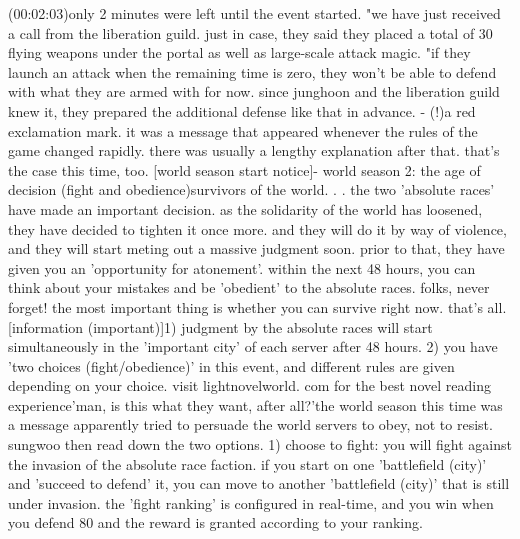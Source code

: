  (00:02:03)only 2 minutes were left until the event started.
"we have just received a call from the liberation guild.
 just in case, they said they placed a total of 30 flying weapons under the portal as well as large-scale attack magic.
"if they launch an attack when the remaining time is zero, they won't be able to defend with what they are armed with for now.
 since junghoon and the liberation guild knew it, they prepared the additional defense like that in advance.
- (!)a red exclamation mark.
it was a message that appeared whenever the rules of the game changed rapidly.
there was usually a lengthy explanation after that.
 that's the case this time, too.
[world season start notice]- world season 2: the age of decision (fight and obedience)survivors of the world.
.
.
 the two 'absolute races' have made an important decision.
as the solidarity of the world has loosened, they have decided to tighten it once more.
 and they will do it by way of violence, and they will start meting out a massive judgment soon.
prior to that, they have given you an 'opportunity for atonement'.
 within the next 48 hours, you can think about your mistakes and be 'obedient' to the absolute races.
folks, never forget! the most important thing is whether you can survive right now.
 that's all.
[information (important)]1) judgment by the absolute races will start simultaneously in the 'important city' of each server after 48 hours.
2) you have 'two choices (fight/obedience)' in this event, and different rules are given depending on your choice.
visit lightnovelworld.
c‌om for the best novel reading experience'man, is this what they want, after all?'the world season this time was a message apparently tried to persuade the world servers to obey, not to resist.
sungwoo then read down the two options.
1) choose to fight: you will fight against the invasion of the absolute race faction.
 if you start on one 'battlefield (city)' and 'succeed to defend' it, you can move to another 'battlefield (city)' that is still under invasion.
the 'fight ranking' is configured in real-time, and you win when you defend 80%
 and the reward is granted according to your ranking.



